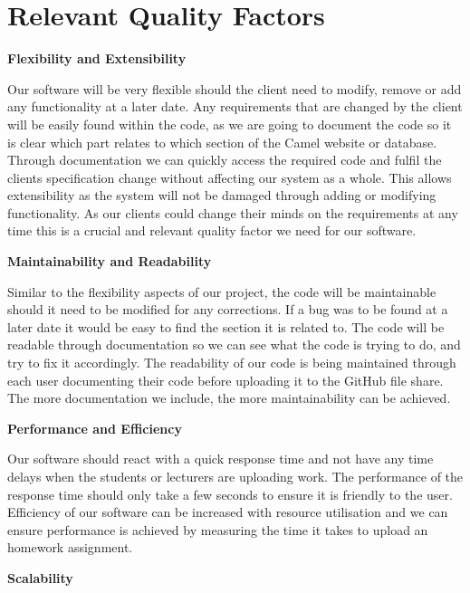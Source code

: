 \documentclass[12pt]{article}
\begin{document}
\newpage
    
	\section{Relevant Quality Factors}
	\textbf{Flexibility and Extensibility}  

Our software will be very flexible should the client need to modify, remove or add any functionality at a later date. Any requirements that are changed by the client will be easily found within the code, as we are going to document the code so it is clear which part relates to which section of the Camel website or database. Through documentation we can quickly access the required code and fulfil the clients specification change without affecting our system as a whole. This allows extensibility as the system will not be damaged through adding or modifying functionality. As our clients could change their minds on the requirements at any time this is a crucial and relevant quality factor we need for our software. 

    \textbf{Maintainability and Readability}   
    
Similar to the flexibility aspects of our project, the code will be maintainable should it need to be modified for any corrections. If a bug was to be found at a later date it would be easy to find the section it is related to. The code will be readable through documentation so we can see what the code is trying to do, and try to fix it accordingly. The readability of our code is being maintained through each user documenting their code before uploading it to the GitHub file share. The more documentation we include, the more maintainability can be achieved.

	\textbf{Performance and Efficiency} 
    
Our software should react with a quick response time and not have any time delays when the students or lecturers are uploading work. The performance of the response time should only take a few seconds to ensure it is friendly to the user. Efficiency of our software can be increased with resource utilisation and we can ensure performance is achieved by measuring the time it takes to upload an homework assignment. 

	\newpage
    
    \textbf{Scalability}   
    
\end{document}
